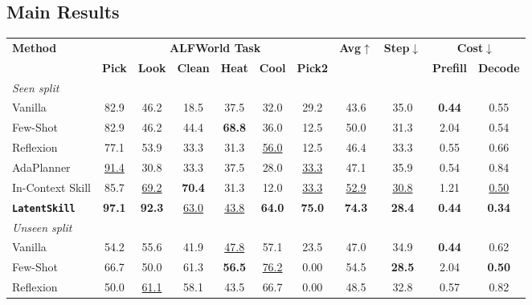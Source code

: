 \documentclass{llmxive}
\providecommand{\best}[1]{\textbf{#1}}
\providecommand{\second}[1]{\underline{#1}}
\providecommand{\textttt}[1]{\texttt{#1}}
\providecommand{\method}{\textbf{\textttt{LatentSkill}}}
\providecommand{\arraystretch}{1.05}
\begin{document}
\subsection{Main Results}

\begin{table}[t]
\centering
\small
\setlength{\tabcolsep}{4pt}
\renewcommand{\arraystretch}{1.05}
\begin{tabular}{
  l
  cccccc   %
  c|       %
  c        %
  cc       %
}
\toprule
\multirow{2}{*}{\textbf{Method}}
  & \multicolumn{6}{c}{\textbf{ALFWorld Task}}
  & \multirow{2}{*}{\textbf{Avg}$\uparrow$}
  & \multirow{2}{*}{\textbf{Step}$\downarrow$}
  & \multicolumn{2}{c}{\textbf{Cost}$\downarrow$} \\
\cmidrule(lr){2-7}\cmidrule(lr){10-11}
  & \textbf{Pick} & \textbf{Look} & \textbf{Clean}
  & \textbf{Heat} & \textbf{Cool} & \textbf{Pick2}
  & & & \textbf{Prefill} & \textbf{Decode} \\
\midrule
\multicolumn{11}{l}{\emph{Seen split}} \\[2pt]
Vanilla
  & 82.9 & 46.2 & 18.5 & 37.5 & 32.0 & 29.2 & 43.6
  & 35.0 & \best{0.44} & 0.55 \\
Few-Shot
  & 82.9 & 46.2 & 44.4 & \best{68.8} & 36.0 & 12.5 & 50.0
  & 31.3 & 2.04 & 0.54 \\
Reflexion
  & 77.1 & 53.9 & 33.3 & 31.3 & \second{56.0} & 12.5 & 46.4
  & 33.3 & 0.55 & 0.66 \\
AdaPlanner
  & \second{91.4} & 30.8 & 33.3 & 37.5 & 28.0 & \second{33.3} & 47.1
  & 35.9 & 0.54 & 0.84 \\
In-Context Skill
  & 85.7 & \second{69.2} & \best{70.4} & 31.3 & 12.0 & \second{33.3} & \second{52.9}
  & \second{30.8} & 1.21 & \second{0.50} \\
\rowcolor{ourblue}
\textbf{\method{}}
  & \best{97.1} & \best{92.3} & \second{63.0} & \second{43.8}
  & \best{64.0} & \best{75.0} & \best{74.3}
  & \best{28.4} & \best{0.44} & \best{0.34} \\
\midrule
\multicolumn{11}{l}{\emph{Unseen split}} \\[2pt]
Vanilla
  & 54.2 & 55.6 & 41.9 & \second{47.8} & 57.1 & 23.5 & 47.0
  & 34.9 & \best{0.44} & 0.62 \\
Few-Shot
  & 66.7 & 50.0 & 61.3 & \best{56.5} & \second{76.2} &  0.00 & 54.5
  & \best{28.5} & 2.04 & \best{0.50} \\
Reflexion
  & 50.0 & \second{61.1} & 58.1 & 43.5 & 66.7 &  0.00 & 48.5
  & 32.8 & 0.57 & 0.82 \\

\end{tabular}
\end{table}
\end{document}
